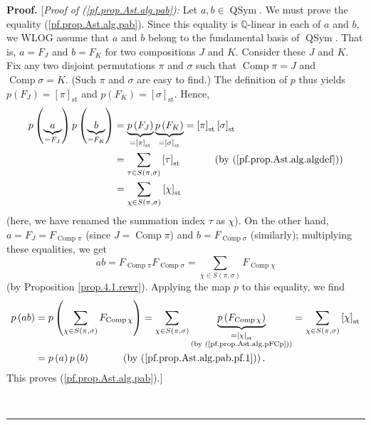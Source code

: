 \documentclass[numbers=enddot,12pt,final,onecolumn,notitlepage]{scrartcl}%
\theoremstyle{definition}
\newenvironment{proof}[1][Proof]{\noindent\textbf{#1.} }{\ \rule{0.5em}{0.5em}}
\newenvironment{verlong}{}{}
\let\sumnonlimits\sum
\renewcommand{\sum}{\sumnonlimits\limits}
\begin{document}
\begin{verlong}
\begin{proof}
[\textit{Proof of (\ref{pf.prop.Ast.alg.pab}):} Let $a,b\in
\operatorname*{QSym}$. We must prove the equality (\ref{pf.prop.Ast.alg.pab}).
Since this equality is $\mathbb{Q}$-linear in each of $a$ and $b$, we WLOG
assume that $a$ and $b$ belong to the fundamental basis of
$\operatorname*{QSym}$. That is, $a=F_{J}$ and $b=F_{K}$ for two compositions
$J$ and $K$. Consider these $J$ and $K$. Fix any two disjoint permutations
$\pi$ and $\sigma$ such that $\operatorname*{Comp}\pi=J$ and
$\operatorname*{Comp}\sigma=K$. (Such $\pi$ and $\sigma$ are easy to find.)
The definition of $p$ thus yields $p\left(  F_{J}\right)  =\left[  \pi\right]
_{\operatorname{st}}$ and $p\left(  F_{K}\right)  =\left[  \sigma\right]
_{\operatorname{st}}$. Hence,%
\begin{align}
p\left(  \underbrace{a}_{=F_{J}}\right)  p\left(  \underbrace{b}_{=F_{K}%
}\right)   &  =\underbrace{p\left(  F_{J}\right)  }_{=\left[  \pi\right]
_{\operatorname{st}}}\underbrace{p\left(  F_{K}\right)  }_{=\left[
\sigma\right]  _{\operatorname{st}}}
=\left[  \pi\right]  _{\operatorname{st}}
\left[  \sigma\right]  _{\operatorname{st}}\nonumber\\
&  =\sum_{\tau\in S\left(  \pi,\sigma\right)  }\left[  \tau\right]
_{\operatorname{st}}\ \ \ \ \ \ \ \ \ \ \left(  \text{by
(\ref{pf.prop.Ast.alg.algdef})}\right) \nonumber\\
&  =\sum_{\chi\in S\left(  \pi,\sigma\right)  }\left[  \chi\right]
_{\operatorname{st}} \label{pf.prop.Ast.alg.pab.pf.1}%
\end{align}
(here, we have renamed the summation index $\tau$ as $\chi$). On the other
hand, $a=F_{J}=F_{\operatorname*{Comp}\pi}$ (since $J=\operatorname*{Comp}\pi
$) and $b=F_{\operatorname*{Comp}\sigma}$ (similarly); multiplying these
equalities, we get%
\[
ab=F_{\operatorname*{Comp}\pi}F_{\operatorname*{Comp}\sigma}=\sum_{\chi\in
S\left(  \pi,\sigma\right)  }F_{\operatorname*{Comp}\chi}%
\]
(by Proposition \ref{prop.4.1.rewr}). Applying the map $p$ to this equality,
we find%
\begin{align*}
p\left(  ab\right)   &  =p\left(  \sum_{\chi\in S\left(  \pi,\sigma\right)
}F_{\operatorname*{Comp}\chi}\right)  =\sum_{\chi\in S\left(  \pi
,\sigma\right)  }\underbrace{p\left(  F_{\operatorname*{Comp}\chi}\right)
}_{\substack{=\left[  \chi\right]  _{\operatorname{st}}\\\text{(by
(\ref{pf.prop.Ast.alg.pFCp}))}}}=\sum_{\chi\in S\left(  \pi,\sigma\right)
}\left[  \chi\right]  _{\operatorname{st}}\\
&  =p\left(  a\right)  p\left(  b\right)  \ \ \ \ \ \ \ \ \ \ \left(  \text{by
(\ref{pf.prop.Ast.alg.pab.pf.1})}\right)  .
\end{align*}
This proves (\ref{pf.prop.Ast.alg.pab}).]


\end{proof}
\end{verlong}
\end{document}
